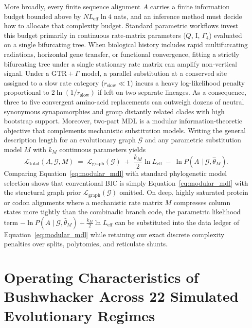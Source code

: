 \documentclass[11pt,a4paper]{article}
\begin{document}
More broadly, every finite sequence alignment $A$ carries a finite information budget bounded above by $N L_{\text{eff}} \ln 4$ nats, and an inference method must decide how to allocate that complexity budget. Standard parametric workflows invest this budget primarily in continuous rate-matrix parameters ($Q$, $\text{I}$, $\Gamma_4$) evaluated on a single bifurcating tree. When biological history includes rapid multifurcating radiations, horizontal gene transfer, or functional convergence, fitting a strictly bifurcating tree under a single stationary rate matrix can amplify non-vertical signal. Under a $\text{GTR}+\Gamma$ model, a parallel substitution at a conserved site assigned to a slow rate category ($r_{\text{slow}} \ll 1$) incurs a heavy log-likelihood penalty proportional to $2\ln(1 / r_{\text{slow}})$ if left on two separate lineages. As a consequence, three to five convergent amino-acid replacements can outweigh dozens of neutral synonymous synapomorphies and group distantly related clades with high bootstrap support. Moreover, two-part MDL is a modular information-theoretic objective that complements mechanistic substitution models. Writing the general description length for an evolutionary graph $\mathcal{G}$ and any parametric substitution model $M$ with $k_M$ continuous parameters yields
\begin{equation}
    \mathcal{L}_{\text{total}}(A, \mathcal{G}, M) \;=\; \mathcal{L}_{\text{graph}}(\mathcal{G}) \;+\; \frac{k_M}{2}\ln L_{\text{eff}} \;-\; \ln P(A \mid \mathcal{G}, \hat{\theta}_M).
    \label{eq:modular_mdl}
\end{equation}
Comparing Equation~\eqref{eq:modular_mdl} with standard phylogenetic model selection shows that conventional BIC is simply Equation~\eqref{eq:modular_mdl} with the structural graph prior $\mathcal{L}_{\text{graph}}(\mathcal{G})$ omitted. On deep, highly saturated protein or codon alignments where a mechanistic rate matrix $M$ compresses column states more tightly than the combinadic branch code, the parametric likelihood term $-\ln P(A \mid \mathcal{G}, \hat{\theta}_M) + \frac{k_M}{2}\ln L_{\text{eff}}$ can be substituted into the data ledger of Equation~\eqref{eq:modular_mdl} while retaining our exact discrete complexity penalties over splits, polytomies, and reticulate shunts.

\section{Operating Characteristics of Bushwhacker Across 22 Simulated Evolutionary Regimes}
\end{document}
